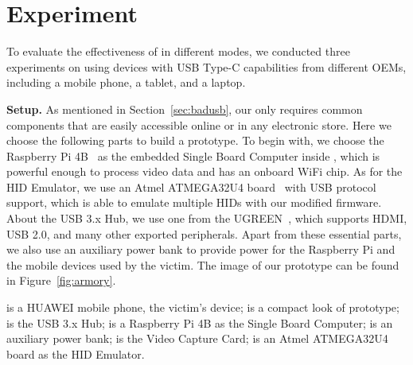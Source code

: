 \section{Experiment}
\label{sec:experiment}


To evaluate the effectiveness of \tool in different modes, we conducted three
experiments on \tool using devices with \ac{USB} Type-C capabilities from different
\acp{OEM}, including a mobile phone, a tablet, and a laptop.

\textbf{Setup.}
As mentioned in Section~\ref{sec:badusb},
our \tool only requires common components that are easily accessible online or
in any electronic store. Here we choose the following parts to build a
prototype. To begin with, we choose the Raspberry Pi 4B~\cite{pi4b} as the embedded Single Board
Computer inside \tool, which is powerful enough to process video data and has
an onboard WiFi chip. As for the \ac{HID} Emulator, we use an Atmel ATMEGA32U4 board~\cite{atmel}
with \ac{USB} protocol support, which is able to emulate multiple \acp{HID}
with our modified firmware. About the \ac{USB} 3.x Hub, we use one from the
UGREEN~\cite{ugreen}, which supports HDMI, \ac{USB} 2.0, and many other exported peripherals.
Apart from these essential parts, we also use an auxiliary power bank to
provide power for the Raspberry Pi and the mobile devices used by the victim.
The image of our \tool prototype can be found in Figure~\ref{fig:armory}.

 is a HUAWEI mobile phone, the victim's device;  is a compact look of \tool prototype;  is the \ac{USB} 3.x Hub;  is a Raspberry Pi 4B as the Single Board Computer;  is an auxiliary power bank;  is the Video Capture Card;  is an Atmel ATMEGA32U4 board as the \ac{HID} Emulator.


